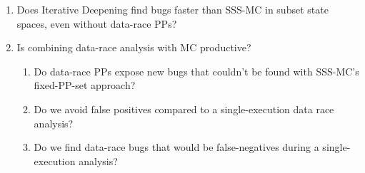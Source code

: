 \begin{enumerate}
	\item Does Iterative Deepening find bugs faster than SSS-MC in subset state spaces, even without data-race PPs?
	\item Is combining data-race analysis with MC productive?
		\begin{enumerate}
			\item Do data-race PPs expose new bugs that couldn't be found with SSS-MC's fixed-PP-set approach?
			\item Do we avoid false positives compared to a single-execution data race analysis?

			\item Do we find data-race bugs that would be false-negatives during a single-execution analysis?%
		\end{enumerate}
\end{enumerate}

